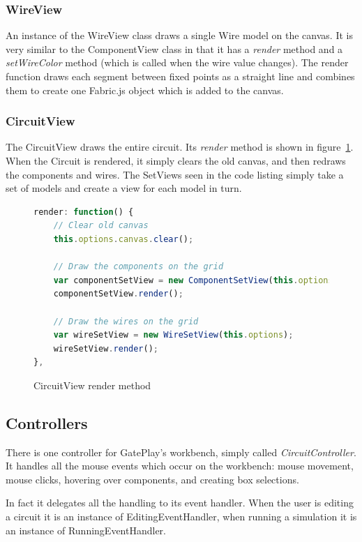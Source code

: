 \subsubsection{WireView}
An instance of the WireView class draws a single Wire model on the canvas. It is very similar to the ComponentView class in that it has a \textit{render} method and a \textit{setWireColor} method (which is called when the wire value changes). The render function draws each segment between fixed points as a straight line and combines them to create one Fabric.js object which is added to the canvas.

\subsubsection{CircuitView}
The CircuitView draws the entire circuit. Its \textit{render} method is shown in figure~\ref{fig:circuitrender}. When the Circuit is rendered, it simply clears the old canvas, and then redraws the components and wires. The SetViews seen in the code listing simply take a set of models and create a view for each model in turn.

\begin{figure}
\begin{lstlisting}[language=JavaScript]
render: function() {
	// Clear old canvas
    this.options.canvas.clear();

    // Draw the components on the grid
    var componentSetView = new ComponentSetView(this.options);
    componentSetView.render();

    // Draw the wires on the grid
    var wireSetView = new WireSetView(this.options);
    wireSetView.render();
},
\end{lstlisting}
\caption{CircuitView render method}
\label{fig:circuitrender}
\end{figure}

\subsection{Controllers}
There is one controller for GatePlay's workbench, simply called \textit{CircuitController}. It handles all the mouse events which occur on the workbench: mouse movement, mouse clicks, hovering over components, and creating box selections.

In fact it delegates all the handling to its event handler. When the user is editing a circuit it is an instance of EditingEventHandler, when running a simulation it is an instance of RunningEventHandler.

